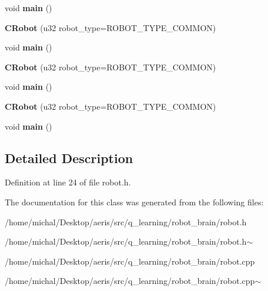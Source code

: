 \begin{DoxyCompactItemize}
\item 
\hypertarget{classCRobot_afe0ad435ce2fe954ab7d1eca609d516d}{void {\bfseries main} ()}\label{classCRobot_afe0ad435ce2fe954ab7d1eca609d516d}

\item 
\hypertarget{classCRobot_a0be52a69a658faa46eb952d98a0ecc3d}{{\bfseries C\-Robot} (u32 robot\-\_\-type=R\-O\-B\-O\-T\-\_\-\-T\-Y\-P\-E\-\_\-\-C\-O\-M\-M\-O\-N)}\label{classCRobot_a0be52a69a658faa46eb952d98a0ecc3d}

\item 
\hypertarget{classCRobot_afe0ad435ce2fe954ab7d1eca609d516d}{void {\bfseries main} ()}\label{classCRobot_afe0ad435ce2fe954ab7d1eca609d516d}

\item 
\hypertarget{classCRobot_a0be52a69a658faa46eb952d98a0ecc3d}{{\bfseries C\-Robot} (u32 robot\-\_\-type=R\-O\-B\-O\-T\-\_\-\-T\-Y\-P\-E\-\_\-\-C\-O\-M\-M\-O\-N)}\label{classCRobot_a0be52a69a658faa46eb952d98a0ecc3d}

\item 
\hypertarget{classCRobot_afe0ad435ce2fe954ab7d1eca609d516d}{void {\bfseries main} ()}\label{classCRobot_afe0ad435ce2fe954ab7d1eca609d516d}

\item 
\hypertarget{classCRobot_a0be52a69a658faa46eb952d98a0ecc3d}{{\bfseries C\-Robot} (u32 robot\-\_\-type=R\-O\-B\-O\-T\-\_\-\-T\-Y\-P\-E\-\_\-\-C\-O\-M\-M\-O\-N)}\label{classCRobot_a0be52a69a658faa46eb952d98a0ecc3d}

\item 
\hypertarget{classCRobot_afe0ad435ce2fe954ab7d1eca609d516d}{void {\bfseries main} ()}\label{classCRobot_afe0ad435ce2fe954ab7d1eca609d516d}

\end{DoxyCompactItemize}


\subsection{Detailed Description}


Definition at line 24 of file robot.\-h.



The documentation for this class was generated from the following files\-:\begin{DoxyCompactItemize}
\item 
/home/michal/\-Desktop/aeris/src/q\-\_\-learning/robot\-\_\-brain/robot.\-h\item 
/home/michal/\-Desktop/aeris/src/q\-\_\-learning/robot\-\_\-brain/robot.\-h$\sim$\item 
/home/michal/\-Desktop/aeris/src/q\-\_\-learning/robot\-\_\-brain/robot.\-cpp\item 
/home/michal/\-Desktop/aeris/src/q\-\_\-learning/robot\-\_\-brain/robot.\-cpp$\sim$\end{DoxyCompactItemize}
